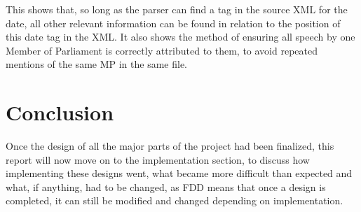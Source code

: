 This shows that, so long as the parser can find a tag in the source XML for the date, all other relevant information can be found in relation to the position of this date tag in the XML. It also shows the method of ensuring all speech by one Member of Parliament is correctly attributed to them, to avoid repeated mentions of the same MP in the same file.

\section{Conclusion}
Once the design of all the major parts of the project had been finalized, this report will now move on to the implementation section, to discuss how implementing these designs went, what became more difficult than expected and what, if anything, had to be changed, as FDD means that once a design is completed, it can still be modified and changed depending on implementation.